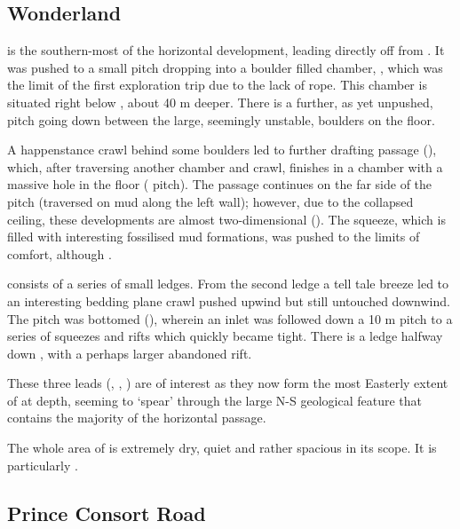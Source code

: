\subsection{Wonderland}

 is the southern-most of the horizontal development,
leading directly off from . It was pushed to a small pitch
dropping into a boulder filled chamber, , which was
the limit of the first exploration trip due to the lack of rope. This
chamber is situated right below , about 40 m deeper. There is a
further, as yet unpushed, pitch going down between the large, seemingly unstable, boulders on the floor.

A happenstance crawl behind some boulders led to further drafting
passage (), which, after traversing another
chamber and crawl, finishes in a chamber with a massive hole in the
floor ( pitch). The passage continues on the far side of
the pitch (traversed on mud along the left wall); however, due to the
collapsed ceiling, these developments are almost two-dimensional
(). The squeeze, which is filled with interesting
fossilised mud formations, was pushed to the limits of comfort, although
.

 consists of a series of small ledges. From the second
ledge a tell tale breeze led to an interesting bedding plane crawl
pushed upwind but still untouched downwind. The pitch was bottomed (), wherein an inlet was followed down a 10 m pitch to a series of
squeezes and rifts which quickly became tight. There is a ledge halfway
down , with a perhaps larger abandoned rift.

These three leads (, , ) are of
interest as they now form the most Easterly extent of 
at depth, seeming to `spear' through the large N-S geological feature
that contains the majority of the horizontal passage.

The whole area of  is extremely dry, quiet and rather
spacious in its scope. It is particularly .


\subsection{Prince Consort Road}

